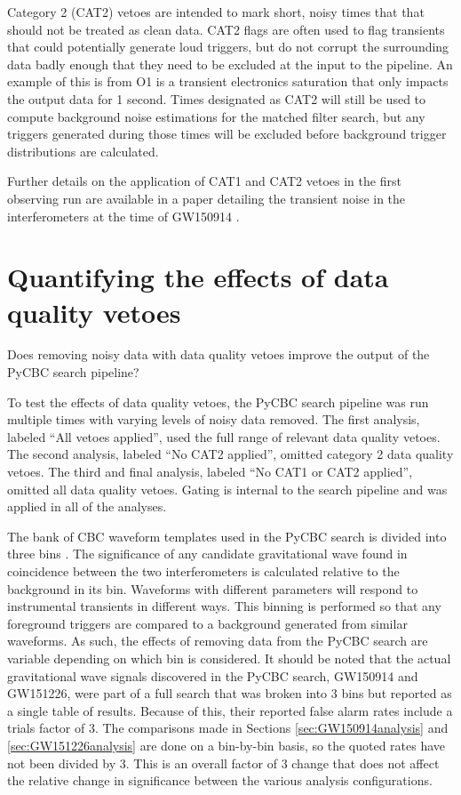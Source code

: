 Category 2 (CAT2) vetoes are intended to mark short, noisy times that
that should not be treated as clean data. CAT2 flags are often
used to flag transients that could potentially generate loud triggers, but do not
corrupt the surrounding data badly enough that they need to be excluded at the input to the pipeline.
An example of this is from O1 is a transient electronics saturation that only impacts the output
data for 1 second.  Times designated
as CAT2 will still be used to compute background noise estimations for the matched filter search,
but any triggers generated
during those times will be excluded before background trigger distributions are calculated.

Further details on the application of CAT1 and CAT2 vetoes in the first observing run
are available in a paper detailing the transient noise in the interferometers at the
time of GW150914 \cite{GW150914-DETCHAR}.

\section{Quantifying the effects of data quality vetoes}\label{sec:methodology}
Does removing noisy data with data quality vetoes improve the output of the PyCBC search pipeline?

To test the effects of data quality vetoes, the PyCBC search pipeline was run multiple times with
varying levels of noisy data removed. The first analysis, labeled
``All vetoes applied'', used the full range of relevant data quality vetoes. The second
analysis, labeled ``No CAT2 applied'', omitted category 2 data quality vetoes. The third and final
analysis, labeled ``No CAT1 or CAT2 applied'', omitted all data quality vetoes.
Gating is internal to the search pipeline and was applied in all of the analyses.

The bank of CBC waveform templates used in the PyCBC search is divided into three bins
\cite{GW150914-CBC}. The significance of any candidate gravitational wave found in
coincidence between the two interferometers is calculated relative to the background in its bin.
Waveforms with different parameters will respond to instrumental transients in different ways.
This binning is performed so that any foreground triggers are compared to a background
generated from similar waveforms.
As such, the effects of removing data from the PyCBC search are variable depending on
which bin is considered. It should be noted that the actual gravitational wave signals
discovered in the PyCBC search,
GW150914 and GW151226, were part of a full search that was broken into 3 bins but reported
as a single table of results. Because of this,
their reported false alarm rates include a trials factor of 3. The comparisons made in Sections
\ref{sec:GW150914analysis} and \ref{sec:GW151226analysis} are done on a bin-by-bin basis,
so the quoted rates have not been divided by 3. This is an overall factor of 3 change
that does not affect the relative change in significance between the various analysis
configurations.


